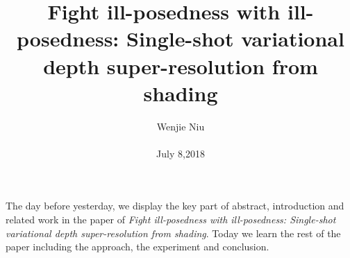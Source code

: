 \documentclass[10pt,twocolumn,letterpaper]{article}
\begin{document}
\title{Fight ill-posedness with ill-posedness: Single-shot variational depth super-resolution from shading}

\author{Wenjie Niu\\\\ July 8,2018}

\maketitle
The day before yesterday, we display the key part of abstract, introduction and related work in the paper of \emph{Fight ill-posedness with ill-posedness: Single-shot variational depth super-resolution from shading}. Today we learn the rest of the paper including the approach, the experiment and conclusion.\par
\end{document}
